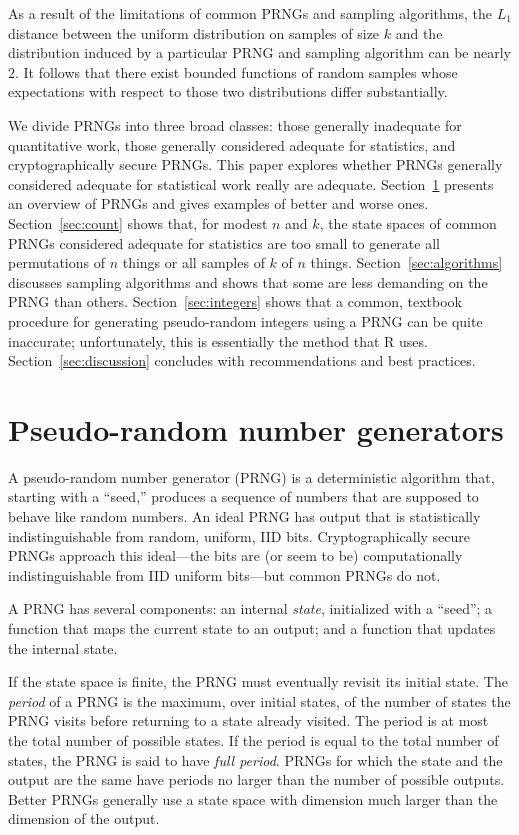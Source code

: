 \documentclass[graybox]{svmult}
\begin{document}
As a result of the limitations of common PRNGs and sampling algorithms,
the $L_1$ distance between the uniform distribution on samples of
size $k$ and the distribution induced by a particular PRNG and sampling algorithm can be nearly $2$.
It follows that there exist bounded functions of random samples whose expectations with respect to those two distributions differ substantially. 

We divide PRNGs into three broad classes: those generally inadequate for quantitative work, those generally considered adequate for statistics, and cryptographically secure
PRNGs.
This paper explores whether PRNGs generally considered adequate for statistical work really are
adequate.
Section~\ref{sec:prngs} presents an overview of PRNGs and gives examples of better and worse ones.
Section~\ref{sec:count} shows that, for modest $n$ and $k$, the state spaces of common PRNGs considered adequate for statistics are too small to generate all permutations of $n$ things or all samples of $k$ of $n$ things. 
Section~\ref{sec:algorithms} discusses sampling algorithms and shows that some are less demanding on the PRNG than others. 
Section~\ref{sec:integers} shows that a common, textbook procedure for generating pseudo-random integers using a PRNG can be quite inaccurate; unfortunately, this is essentially the method that R uses.
Section~\ref{sec:discussion} concludes with recommendations and best practices.

\section{Pseudo-random number generators}
\label{sec:prngs}

A pseudo-random number generator (PRNG) is a deterministic algorithm that, starting with
a ``seed,'' produces a sequence of numbers that are supposed to behave like random numbers.
An ideal PRNG has output that is statistically indistinguishable from random, uniform, IID bits. 
Cryptographically secure PRNGs approach this ideal---the bits are (or seem to be) computationally 
indistinguishable from IID uniform bits---but common PRNGs do not.

A PRNG has several components:
an internal \emph{state}, initialized with a ``seed'';
a function that maps the current state to an output;
and a function that updates the internal state.

If the state space is finite, the PRNG must eventually revisit its initial state.
The \emph{period} of a PRNG is the maximum, over initial states, of the number of states 
the PRNG visits before returning to a state already visited.
The period is at most the total number of possible states.
If the period is equal to the total number of states, the PRNG is said to have \emph{full period}.
PRNGs for which the state and the output are the same have periods no larger than the number of possible outputs.
Better PRNGs generally use a state space with dimension much larger than the dimension of the output.
\end{document}
